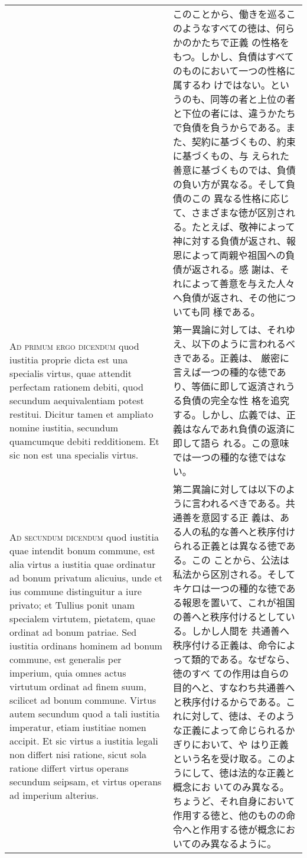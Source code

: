 \documentclass[10pt]{jsarticle}
\begin{document}
\begin{longtable}{p{21em}p{21em}}
&

 このことから、働きを巡るこのようなすべての徳は、何らかのかたちで正義
 の性格をもつ。しかし、負債はすべてのものにおいて一つの性格に属するわ
 けではない。というのも、同等の者と上位の者と下位の者には、違うかたち
 で負債を負うからである。また、契約に基づくもの、約束に基づくもの、与
 えられた善意に基づくものでは、負債の負い方が異なる。そして負債のこの
 異なる性格に応じて、さまざまな徳が区別される。たとえば、敬神によって
 神に対する負債が返され、報恩によって両親や祖国への負債が返される。感
 謝は、それによって善意を与えた人々へ負債が返され、その他についても同
 様である。
 
\\



{\scshape Ad primum ergo dicendum} quod iustitia proprie dicta est una
specialis virtus, quae attendit perfectam rationem debiti, quod
secundum aequivalentiam potest restitui. Dicitur tamen et ampliato
nomine iustitia, secundum quamcumque debiti redditionem. Et sic non
est una specialis virtus.


&

 第一異論に対しては、それゆえ、以下のように言われるべきである。正義は、
 厳密に言えば一つの種的な徳であり、等価に即して返済されうる負債の完全な性
 格を追究する。しかし、広義では、正義はなんであれ負債の返済に即して語ら
 れる。この意味では一つの種的な徳ではない。

 
\\



{\scshape Ad secundum dicendum} quod iustitia quae intendit bonum
commune, est alia virtus a iustitia quae ordinatur ad bonum privatum
alicuius, unde et ius commune distinguitur a iure privato; et Tullius
ponit unam specialem virtutem, pietatem, quae ordinat ad bonum
patriae. Sed iustitia ordinans hominem ad bonum commune, est generalis
per imperium, quia omnes actus virtutum ordinat ad finem suum,
scilicet ad bonum commune. Virtus autem secundum quod a tali iustitia
imperatur, etiam iustitiae nomen accipit. Et sic virtus a iustitia
legali non differt nisi ratione, sicut sola ratione differt virtus
operans secundum seipsam, et virtus operans ad imperium alterius.


&

 第二異論に対しては以下のように言われるべきである。共通善を意図する正
 義は、ある人の私的な善へと秩序付けられる正義とは異なる徳である。この
 ことから、公法は私法から区別される。そしてキケロは一つの種的な徳であ
 る報恩を置いて、これが祖国の善へと秩序付けるとしている。しかし人間を
 共通善へ秩序付ける正義は、命令によって類的である。なぜなら、徳のすべ
 ての作用は自らの目的へと、すなわち共通善へと秩序付けるからである。こ
 れに対して、徳は、そのような正義によって命じられるかぎりにおいて、や
 はり正義という名を受け取る。このようにして、徳は法的な正義と概念にお
 いてのみ異なる。ちょうど、それ自身において作用する徳と、他のものの命
 令へと作用する徳が概念においてのみ異なるように。
 

\end{longtable}
\end{document}
